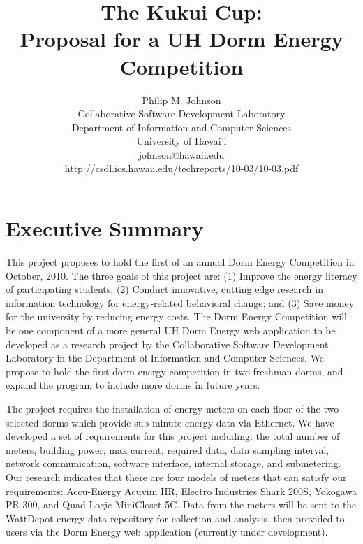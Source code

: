 \documentclass[11pt]{article}
\begin{document}
\title{The Kukui Cup: \\Proposal for a UH Dorm Energy Competition}

\author{Philip M. Johnson \\
Collaborative Software Development Laboratory \\
Department of Information and Computer Sciences \\
University of Hawai'i \\
johnson@hawaii.edu \\
\url{http://csdl.ics.hawaii.edu/techreports/10-03/10-03.pdf}
}

\maketitle

\tableofcontents
\newpage

\section{Executive Summary}

This project proposes to hold the first of an annual Dorm Energy
Competition in October, 2010.  The three goals of this project are: (1)
Improve the energy literacy of participating students; (2) Conduct
innovative, cutting edge research in information technology for
energy-related behavioral change; and (3) Save money for the university by
reducing energy costs.  The Dorm Energy Competition will be one component
of a more general UH Dorm Energy web application to be developed as a
research project by the Collaborative Software Development Laboratory in
the Department of Information and Computer Sciences.  We propose to hold
the first dorm energy competition in two freshman dorms, and expand the
program to include more dorms in future years.

The project requires the installation of energy meters on each floor of the
two selected dorms which provide sub-minute energy data via Ethernet.  We
have developed a set of requirements for this project including: the total
number of meters, building power, max current, required data, data sampling
interval, network communication, software interface, internal storage, and
submetering.  Our research indicates that there are four models of meters
that can satisfy our requirements: Accu-Energy Acuvim IIR, Electro
Industries Shark 200S, Yokogawa PR 300, and Quad-Logic MiniCloset 5C.  Data
from the meters will be sent to the WattDepot energy data repository for
collection and analysis, then provided to users via the Dorm Energy web
application (currently under development).
\end{document}
